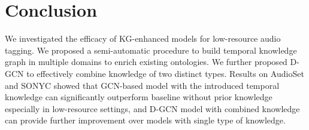 \section{Conclusion}
We investigated the efficacy of KG-enhanced models for low-resource audio tagging. We proposed a semi-automatic procedure to build temporal knowledge graph in multiple domains to enrich existing ontologies. We further proposed D-GCN to effectively combine knowledge of two distinct types. Results on AudioSet and SONYC showed that GCN-based model with the introduced temporal knowledge can significantly outperform baseline without prior knowledge especially in low-resource settings, and D-GCN model with combined knowledge can provide further improvement over models with single type of knowledge. 
